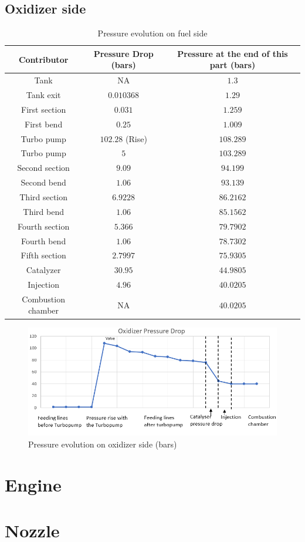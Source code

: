 \subsection{Oxidizer side}
\begin{table}[H]
	\centering
\begin{tabular}[H]{|c|c|c|}
	\hline
	\cellcolor{gray!50}Contributor& \cellcolor{gray!50}Pressure Drop (bars) & \cellcolor{gray!50}Pressure at the end of this part (bars)\\
	\hline
	Tank & NA & $1.3$ \\
	\hline
	Tank exit & $0.010368$ & $1.29$\\
	\hline
	First section & $0.031$ &$1.259$\\
	\hline
	First bend &$0.25$ &$1.009$\\
	\hline
	Turbo pump & $102.28 $ (Rise) &$108.289$\\
	\hline
	Turbo pump & $5$ &$103.289$\\
	\hline
	Second section &$9.09$ &$94.199$\\
	\hline
	Second bend &$1.06$ &$93.139$\\
	\hline
	Third section &$6.9228$ &$86.2162$\\
	\hline
	Third bend &$1.06$ &$85.1562$\\
	\hline
	Fourth section &$5.366$ &$79.7902$\\
	\hline
	Fourth bend &$1.06$ &$78.7302$\\
	\hline
	Fifth section &$2.7997$ &$75.9305$\\
	\hline
	Catalyzer &$30.95$ &$44.9805$\\
	\hline
	Injection &$4.96$ &$40.0205$\\
	\hline
	Combustion chamber & NA &$40.0205$\\
	\hline
\end{tabular}
\caption{Pressure evolution on fuel side}
\end{table}
\begin{figure}[H]
	\centering
	\includegraphics[width=\linewidth]{oxchart}
	\caption{Pressure evolution on oxidizer side (bars)}
\end{figure}
\section{Engine}
\section{Nozzle}
